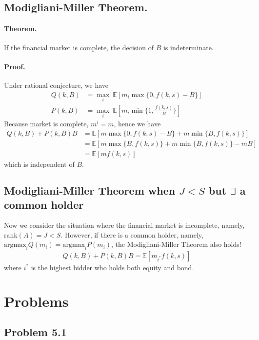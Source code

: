 \subsection{Modigliani-Miller Theorem.}
\paragraph{Theorem.} If the financial market is complete, the decision of $B$ is indeterminate. 
\paragraph{Proof.}
Under rational conjecture, we have 
\begin{align*}
    Q(k, B) & = \max_i \ \mathbb{E}[ m_i \max \{0, f(k, s) - B \} ] \\ 
    P(k, B)  & = \max_i \ \mathbb{E}[ m_i \min \{1, \frac{f(k, s)}{B} \} ]
\end{align*}
Because market is complete, $m^i = m$, hence we have 
\begin{align*}
Q(k, B) + P(k, B) B & = \mathbb{E}[m \max \{0, f(k, s) - B \} + m\min \{B, f(k, s) \} ] \\ 
    & = \mathbb{E}[ m \max \{B, f(k, s) \} + m \min \{B, f(k, s) \} - m B] \\ 
    & = \mathbb{E}[m f(k, s)]
\end{align*}
which is independent of $B$.


\subsection{Modigliani-Miller Theorem when $J < S$ but $\exists$ a common holder}
Now we consider the situation where the financial market is incomplete,
namely, $\text{rank}(A) = J < S$.
However, if there is a common holder, namely, $\text{argmax}_i Q(m_i) = \text{argmax}_i P(m_i)$,
the Modigliani-Miller Theorem also holds!
\begin{align*}
Q(k, B) + P(k, B) B = \mathbb{E}[m_{i^*}  f(k, s)]
\end{align*}
where $i^*$ is the highest bidder who holds both equity and bond.


\section{Problems}
\subsection{Problem 5.1}
